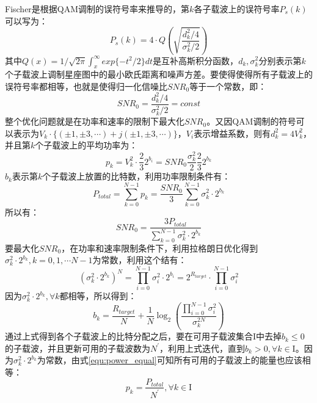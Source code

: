 Fischer是根据QAM调制的误符号率来推导的，第$k$各子载波上的误符号率$P_s(k)$可以写为：
\begin{equation}
P_s(k)=4\cdot Q\left(\sqrt{\frac{d_k^2/4}{\sigma^2_k/2}}\right)
\end{equation}
其中$Q(x)=1/\sqrt{2\pi}\int_x^{\infty}exp\{-t^2/2\}dt$是互补高斯积分函数，$d_k, \sigma^2_k$分别表示第$k$个子载波上调制星座图中的最小欧氏距离和噪声方差。要使得使得所有子载波上的误符号率都相等，也就是使得归一化信噪比$SNR_0$等于一个常数，即：
\begin{equation}
SNR_0 = \frac{d_k^2/4}{\sigma^2_k/2}=const
\end{equation}
整个优化问题就是在功率和速率的限制下最大化$SNR_0$。又因QAM调制的符号可以表示为$V_k\cdot\{(\pm 1,\pm3,\cdots)+j(\pm 1,\pm3,\cdots)\}$，$V_i$表示增益系数，则有$d_k^2=4V_k^2$，并且第$k$个子载波上的平均功率为：
\begin{equation}
\label{equ:power_equal}
p_k = V_k^2\cdot \frac{2}{3}2^{b_i} = SNR_0\frac{\sigma^2_k}{2}\frac{2}{3}2^{b_k}
\end{equation}
$b_k$表示第$k$个子载波上放置的比特数，利用功率限制条件有：
\begin{equation}
P_{total} = \sum_{k=0}^{N-1}p_k=\frac{SNR_0}{3}\sum_{k=0}^{N-1}\sigma_k^2\cdot 2^{b_k}
\end{equation}
所以有：
\begin{equation}
SNR_0 = \frac{3P_{total}}{\sum_{k=0}^{N-1}\sigma^2_k\cdot 2^{b_k}}
\end{equation}
要最大化$SNR_0$，在功率和速率限制条件下，利用拉格朗日优化得到$\sigma_k^2\cdot 2^{b_k}, k = 0,1,\cdots N-1$为常数，利用这个结有：
\begin{equation}
(\sigma_k^2\cdot 2^{b_k})^N = \prod_{i=0}^{N-1}\sigma_i^2\cdot 2^{b_i} = 2^{R_{target}}\cdot \prod_{i=0}^{N-1}\sigma_i^2
\end{equation}
因为$\sigma_k^2\cdot 2^{b_k}, \forall k$都相等，所以得到：
\begin{equation}
b_k = \frac{R_{target}}{N} +\frac{1}{N}\log_2\left(\frac{\prod_{i=0}^{N-1}\sigma_i^2}{\sigma_k^{2N}}\right)
\end{equation}
通过上式得到各个子载波上的比特分配之后，要在可用子载波集合$\mathrm{I}$中去掉$b_k\leq 0$的子载波，并且更新可用的子载波数为$N^{\prime}$，利用上式迭代，直到$b_k>0, \forall k\in \mathrm{I}$。因为$\sigma_k^2\cdot 2^{b_k}$为常数，由式\ref{equ:power_equal}可知所有可用的子载波上的能量也应该相等：
\begin{equation}
p_k = \frac{P_{total}}{N^\prime}, \forall k \in \mathrm{I}
\end{equation}

